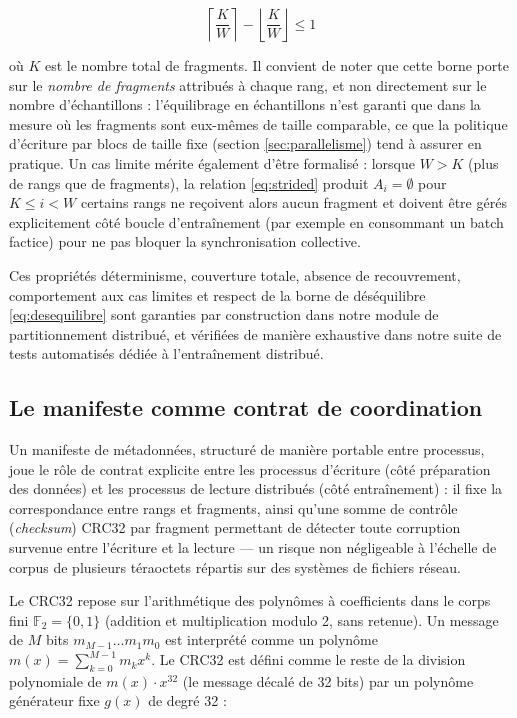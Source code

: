 \documentclass[12pt,a4paper]{report}
\begin{document}
\begin{equation}
\label{eq:desequilibre}
\left\lceil \frac{K}{W} \right\rceil - \left\lfloor \frac{K}{W} \right\rfloor \leq 1
\end{equation}

où $K$ est le nombre total de fragments. Il convient de noter que cette borne porte sur le \emph{nombre de fragments} attribués à chaque rang, et non directement sur le nombre d'échantillons : l'équilibrage en échantillons n'est garanti que dans la mesure où les fragments sont eux-mêmes de taille comparable, ce que la politique d'écriture par blocs de taille fixe (section \ref{sec:parallelisme}) tend à assurer en pratique. Un cas limite mérite également d'être formalisé : lorsque $W > K$ (plus de rangs que de fragments), la relation \eqref{eq:strided} produit $A_i = \emptyset$ pour $K \leq i < W$ certains rangs ne reçoivent alors aucun fragment et doivent être gérés explicitement côté boucle d'entraînement (par exemple en consommant un batch factice) pour ne pas bloquer la synchronisation collective.

Ces propriétés déterminisme, couverture totale, absence de recouvrement, comportement aux cas limites et respect de la borne de déséquilibre \eqref{eq:desequilibre} sont garanties par construction dans notre module de partitionnement distribué, et vérifiées de manière exhaustive dans notre suite de tests automatisés dédiée à l'entraînement distribué.

\subsection{Le manifeste comme contrat de coordination}

Un manifeste de métadonnées, structuré de manière portable entre processus, joue le rôle de contrat explicite entre les processus d'écriture (côté préparation des données) et les processus de lecture distribués (côté entraînement) : il fixe la correspondance entre rangs et fragments, ainsi qu'une somme de contrôle (\textit{checksum}) CRC32 par fragment permettant de détecter toute corruption survenue entre l'écriture et la lecture — un risque non négligeable à l'échelle de corpus de plusieurs téraoctets répartis sur des systèmes de fichiers réseau.

Le CRC32 repose sur l'arithmétique des polynômes à coefficients dans le corps fini $\mathbb{F}_2 = \{0,1\}$ (addition et multiplication modulo 2, sans retenue). Un message de $M$ bits $m_{M-1} \ldots m_1 m_0$ est interprété comme un polynôme $m(x) = \sum_{k=0}^{M-1} m_k x^k$. Le CRC32 est défini comme le reste de la division polynomiale de $m(x) \cdot x^{32}$ (le message décalé de 32 bits) par un polynôme générateur fixe $g(x)$ de degré 32 :
\end{document}
